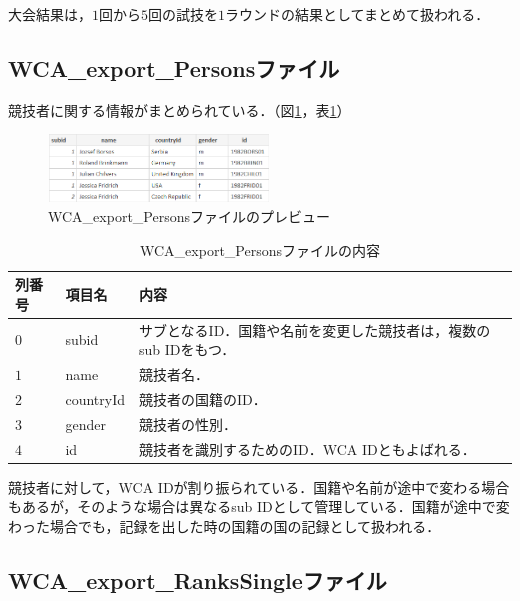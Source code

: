 \documentclass{article}
\begin{document}
  大会結果は，$ 1 $回から$ 5 $回の試技を$ 1 $ラウンドの結果としてまとめて扱われる．\par

  \subsection{WCA\_export\_Personsファイル}

  競技者に関する情報がまとめられている．（図\ref{figure:persons}，表\ref{table:persons}）\par

  \begin{figure}[h]
    \centering
    \includegraphics[height=18mm]{persons.png}
    \caption{WCA\_export\_Personsファイルのプレビュー}
    \label{figure:persons}
  \end{figure}

  \begin{table}[h]
    \centering
    \caption{WCA\_export\_Personsファイルの内容}
    \label{table:persons}
    \begin{tabular}{l|l|l}
      \hline
      列番号 & 項目名 & 内容 \\
      \hline \hline
      $ 0 $ & subid & サブとなるID．国籍や名前を変更した競技者は，複数のsub IDをもつ． \\
      $ 1 $ & name & 競技者名． \\
      $ 2 $ & countryId & 競技者の国籍のID． \\
      $ 3 $ & gender & 競技者の性別． \\
      $ 4 $ & id & 競技者を識別するためのID．WCA IDともよばれる． \\
      \hline
    \end{tabular}
  \end{table}

  競技者に対して，WCA IDが割り振られている．国籍や名前が途中で変わる場合もあるが，そのような場合は異なるsub IDとして管理している．国籍が途中で変わった場合でも，記録を出した時の国籍の国の記録として扱われる．\par

  \subsection{WCA\_export\_RanksSingleファイル}
\end{document}
